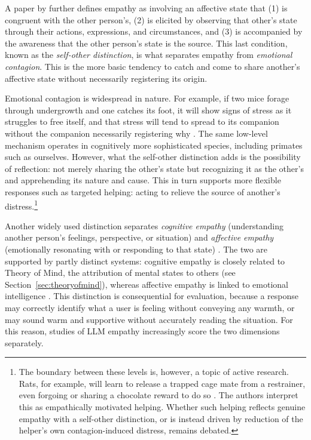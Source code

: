 A paper by \citet{devignemont2006empathic} further defines empathy as involving an affective state that (1) is congruent with the other person's, (2) is elicited by observing that other's state through their actions, expressions, and circumstances, and (3) is accompanied by the awareness that the other person's state is the source. This last condition, known as the \emph{self-other distinction}, is what separates empathy from \emph{emotional contagion}. This is the more basic tendency to catch and come to share another's affective state without necessarily registering its origin. 

Emotional contagion is widespread in nature. For example, if two mice forage through undergrowth and one catches its foot, it will show signs of stress as it struggles to free itself, and that stress will tend to spread to its companion without the companion necessarily registering why \citep{preston2002empathy}. 
The same low-level mechanism operates in cognitively more sophisticated species, including primates such as ourselves. However, what the self-other distinction adds is the possibility of reflection: not merely sharing the other's state but recognizing it as the other's and apprehending its nature and cause. This in turn supports more flexible responses such as targeted helping: acting to relieve the source of another's distress.\footnote{The boundary between these levels is, however, a topic of active research. Rats, for example, will learn to release a trapped cage mate from a restrainer, even forgoing or sharing a chocolate reward to do so \citep{bartal2011empathy}. The authors interpret this as empathically motivated helping. Whether such helping reflects genuine empathy with a self-other distinction, or is instead driven by reduction of the helper's own contagion-induced distress, remains debated.}

Another widely used distinction separates \emph{cognitive empathy} (understanding another person's feelings, perspective, or situation) and \emph{affective empathy} (emotionally resonating with or responding to that state) \citep{dvash2014theory}. The two are supported by partly distinct systems: cognitive empathy is closely related to Theory of Mind, the attribution of mental states to others (see Section~\ref{sec:theoryofmind}), whereas affective empathy is linked  to emotional intelligence \citep{dvash2014theory, preckel2018interaction}. This distinction is consequential for evaluation, because a response may correctly identify what a user is feeling without conveying any warmth, or may sound warm and supportive without accurately reading the situation. For this reason, studies of LLM empathy increasingly score the two dimensions separately.

